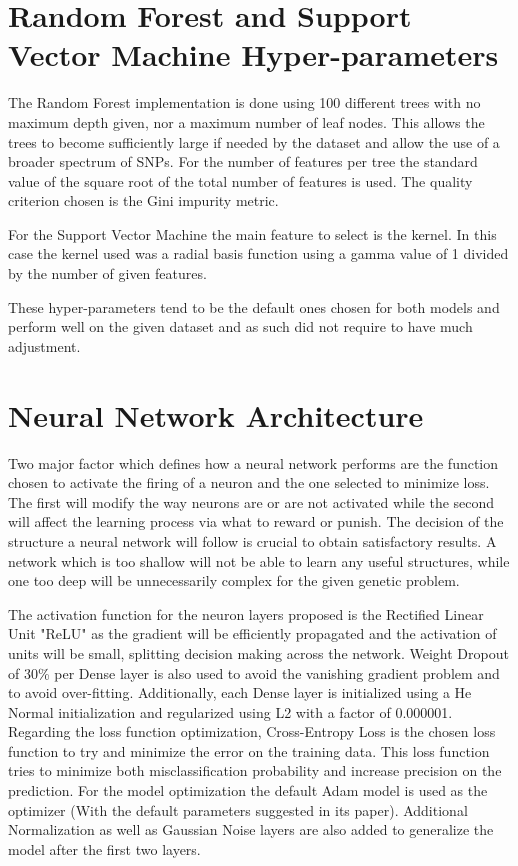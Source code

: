 \section{Random Forest and Support Vector Machine Hyper-parameters}

The Random Forest implementation is done using 100 different trees with no maximum depth given, nor a maximum number of leaf nodes. This allows the trees to become sufficiently large if needed by the dataset and allow the use of a broader spectrum of SNPs. For the number of features per tree the standard value of the square root of the total number of features is used. The quality criterion chosen is the Gini impurity metric.

For the Support Vector Machine the main feature to select is the kernel. In this case the kernel used was a radial basis function using a gamma value of 1 divided by the number of given features. 

These hyper-parameters tend to be the default ones chosen for both models and perform well on the given dataset and as such did not require to have much adjustment.

\section{Neural Network Architecture}

Two major factor which defines how a neural network performs are the function chosen to activate the firing of a neuron and the one selected to minimize loss. The first will modify the way neurons are or are not activated while the second will affect the learning process via what to reward or punish. The decision of the structure a neural network will follow is crucial to obtain satisfactory results. A network which is too shallow will not be able to learn any useful structures, while one too deep will be unnecessarily complex for the given genetic problem.

The activation function for the neuron layers proposed is the Rectified Linear Unit "ReLU" as the gradient will be efficiently propagated and the activation of units will be small, splitting decision making across the network. Weight Dropout of 30\% per Dense layer is also used to avoid the vanishing gradient problem and to avoid over-fitting. Additionally, each Dense layer is initialized using a He Normal initialization and regularized using L2 with a factor of 0.000001.
Regarding the loss function optimization, Cross-Entropy Loss is the chosen loss function to try and minimize the error on the training data. This loss function tries to minimize both misclassification probability and increase precision on the prediction.
For the model optimization the default Adam model is used as the optimizer (With the default parameters suggested in its paper).
Additional Normalization as well as Gaussian Noise layers are also added to generalize the model after the first two layers.


